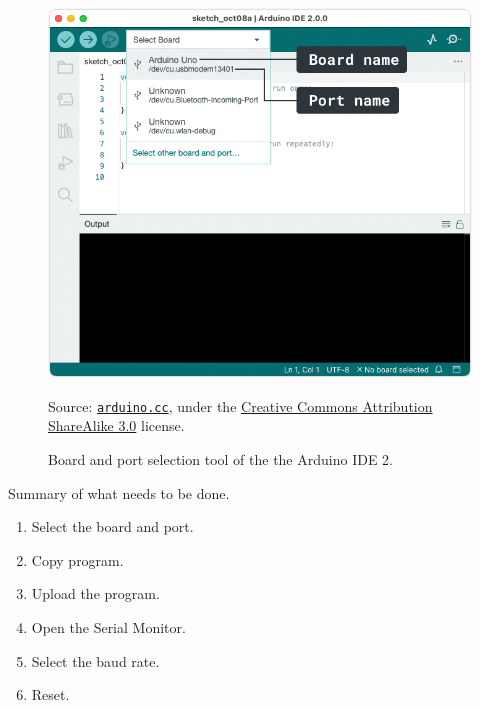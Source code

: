 \begin{figure}[b]
    \centering
    \includegraphics[width=\textwidth]{img/board-selector-labels}%
    \\ \scriptsize
    \raggedright
    Source: \href{https://support.arduino.cc/hc/en-us/articles/4406856349970-Select-board-and-port-in-Arduino-IDE}{\texttt{arduino.cc}}, under the \href{https://creativecommons.org/licenses/by-sa/3.0/legalcode}{Creative Commons Attribution ShareAlike 3.0} license.
  \caption{Board and port selection tool of the the Arduino IDE 2.
  }
  \label{fig:board-selector-labels}
\end{figure}

Summary of what needs to be done.
\begin{enumerate}
\item Select the board and port.
\item Copy program.
\item Upload the program.
\item Open the Serial Monitor.
\item Select the baud rate.
\item Reset.
\end{enumerate}

